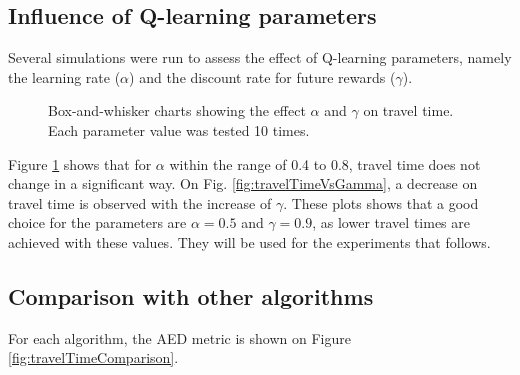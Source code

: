 \documentclass[12pt]{llncs}
\begin{document}
\subsection{Influence of Q-learning parameters}

Several simulations were run to assess the effect of Q-learning parameters, namely the learning rate ($\alpha$) and the discount rate for future rewards ($\gamma$).

\begin{figure}[ht]
  \centering
  \caption{Box-and-whisker charts showing the effect $\alpha$ and $\gamma$ on travel time. Each parameter value was tested 10 times.}
  \label{fig:qLearningParams}
\end{figure}

Figure \ref{fig:qLearningParams} shows that for $\alpha$ within the range of 0.4 to 0.8, travel time does not change in a significant way. On Fig. \ref{fig:travelTimeVsGamma}, a decrease on travel time is observed with the increase of $\gamma$. These plots shows that a good choice for the parameters are $\alpha = 0.5$ and $\gamma = 0.9$, as lower travel times are achieved with these values. They will be used for the experiments that follows.

\subsection{Comparison with other algorithms}

For each algorithm, the AED metric is shown on Figure \ref{fig:travelTimeComparison}. 
\end{document}
